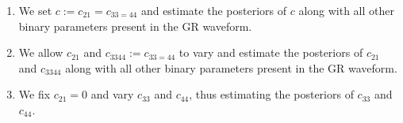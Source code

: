 \documentclass[prd,preprintnumbers,twocolumn,eqsecnum,floatfix,a4paper,nofootinbib,superscriptaddress]{revtex4}
\newcommand{\h}{\mathpzc{h}}
\newcommand{\hlm}{\mathpzc{h}_{\ell m}}
\newcommand{\Ylm}{{Y}^{-2}_{\ell m}}
\newcommand{\blambda}{\bm{\lambda}}
\newcommand{\btheta}{\bm{\theta}}
\begin{document}
\begin{enumerate}
\item We set $c := c_{21} = c_{33 = 44}$ and estimate the posteriors of $c$ along with all other binary parameters present in the GR waveform.  
\item We allow $c_{21}$ and $c_{3344} := c_{33 = 44} $ to vary and estimate the posteriors of $c_{21}$ and $c_{3344}$ along with all other binary parameters present in the GR waveform.  
\item We fix $c_{21} = 0$ and vary $c_{33}$ and $c_{44}$, thus estimating the posteriors of $c_{33}$ and $c_{44}$. 
\end{enumerate}

%  
%  
\end{document}
